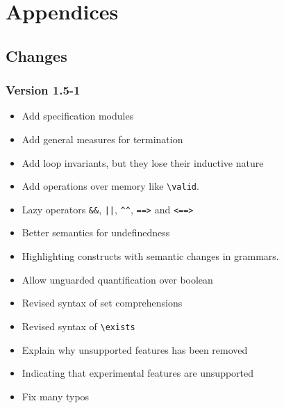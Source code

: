 \documentclass[a4paper,web]{frama-c-book}
\newcommand{\version}{1.5-1}
\begin{document}








\appendix

\chapter{Appendices}
\label{chap:appendix}


%

%

%

\section{Changes}

\subsection{Version \version}

\begin{itemize}
\item Add specification modules
\item Add general measures for termination
\item Add loop invariants, but they lose their inductive \acsl nature
\item Add operations over memory like \lstinline|\valid|.
\item Lazy operators \lstinline|&&|, \lstinline+||+, \lstinline|^^|,
  \lstinline|==>| and \lstinline|<==>|
\item Better semantics for undefinedness
\item Highlighting constructs with semantic changes in grammars.
\item Allow unguarded quantification over boolean
\item Revised syntax of set comprehensions
\item Revised syntax of \lstinline|\exists|
\item Explain why unsupported features has been removed
\item Indicating that experimental \acsl features are unsupported
\item Fix many typos
\end{itemize}
\end{document}
